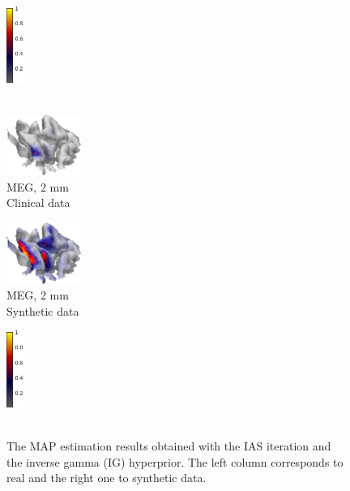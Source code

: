 \documentclass[5p]{elsarticle}
\begin{document}
\begin{figure}[h!]
\begin{footnotesize}
\begin{center}
\begin{minipage}{3cm}
\begin{center}
\end{center}\end{minipage}\begin{minipage}{0.5cm} \begin{center}
\includegraphics[height=2.5cm]{colorbar.png} \\ \mbox{} \\ \mbox{}
\end{center}
\end{minipage} \vskip0.2cm
\begin{minipage}{3cm} \begin{center}
\includegraphics[height=2.0cm]{MAP_MEG_IG_2mm.png}\\ MEG, 2 mm \\ Clinical data
\end{center}\end{minipage}
\begin{minipage}{3cm} \begin{center}
\includegraphics[height=2.0cm]{MAP_MEG_IG_2mm_syntheticdata.png} \\ MEG, 2 mm \\ Synthetic data
\end{center}\end{minipage}
\begin{minipage}{0.5cm} \begin{center}
\includegraphics[height=2.5cm]{colorbar.png} \\ \mbox{} \\ \mbox{}
\end{center}
\end{minipage}
\end{center}
\end{footnotesize}
\caption{The MAP estimation results obtained with the IAS iteration and the inverse gamma (IG) hyperprior. The left column corresponds to real and the right one to synthetic data.}
\label{fig:somatosensory_results_1} 
\end{figure}
\end{document}
